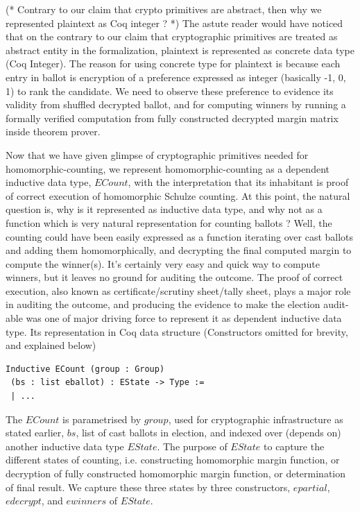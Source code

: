 \documentclass{llncs}
\begin{document}
(* Contrary to our claim that crypto primitives are abstract, then 
why we represented plaintext as Coq integer ? *)
The astute reader would have noticed that on the contrary to our claim that 
cryptographic primitives are treated as abstract entity in the 
formalization, plaintext is represented as concrete data type (Coq Integer).
The reason for using concrete type for plaintext is because each 
entry in ballot is encryption of a preference expressed as integer 
(basically -1, 0, 1) to rank the candidate. 
We need to observe these preference to evidence its validity
from shuffled decrypted ballot, 
and  for computing winners by running a formally verified computation
from fully constructed decrypted margin matrix inside theorem prover.  
 
   
Now that we have given glimpse of cryptographic primitives needed for 
homomorphic-counting, we represent homomorphic-counting  as a 
dependent inductive data type, $ECount$, with the interpretation that its 
inhabitant is proof of correct execution of homomorphic Schulze counting. 
At this point, the natural question is, why is it represented as inductive 
data type, and why not as a function which is very natural representation 
for counting ballots ? 
Well, the counting could have been easily expressed as 
a function iterating over cast ballots and adding them homomorphically,
and decrypting the final computed margin to compute the winner(s). 
It's certainly very easy and quick way to compute winners, but it leaves no 
ground for auditing the outcome. The proof of correct execution, 
also known as certificate/scrutiny sheet/tally sheet, plays a major 
role in auditing the outcome, and producing the evidence 
to make the election audit-able was one of 
major driving force to represent it as dependent inductive data type. Its 
representation in Coq data structure (Constructors omitted for brevity, 
and explained below)
\begin{verbatim}
Inductive ECount (group : Group) 
 (bs : list eballot) : EState -> Type :=
 | ... 
\end{verbatim}

The $ECount$ is parametrised by $group$, used for cryptographic 
infrastructure as stated earlier, 
$bs$, list of cast ballots in election, and indexed over (depends on)
 another inductive data type $EState$.  
 The purpose of $EState$ to capture the different states 
of counting, i.e. constructing homomorphic margin 
function, or decryption of fully constructed homomorphic margin function, or 
determination of final result. We capture these three states by 
 three constructors, $epartial$, $edecrypt$, and $ewinners$ of 
 $EState$.
\end{document}
